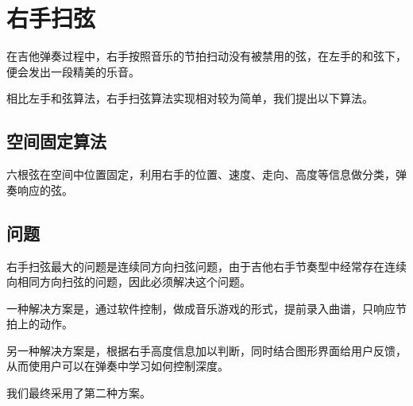      \section{右手扫弦}

        在吉他弹奏过程中，右手按照音乐的节拍扫动没有被禁用的弦，在左手的和弦下，便会发出一段精美的乐音。


        相比左手和弦算法，右手扫弦算法实现相对较为简单，我们提出以下算法。

        \subsection{空间固定算法}

        六根弦在空间中位置固定，利用右手的位置、速度、走向、高度等信息做分类，弹奏响应的弦。

        \subsection{问题}

        右手扫弦最大的问题是连续同方向扫弦问题，由于吉他右手节奏型中经常存在连续向相同方向扫弦的问题，因此必须解决这个问题。


        一种解决方案是，通过软件控制，做成音乐游戏的形式，提前录入曲谱，只响应节拍上的动作。

        另一种解决方案是，根据右手高度信息加以判断，同时结合图形界面给用户反馈，从而使用户可以在弹奏中学习如何控制深度。

        我们最终采用了第二种方案。
       

